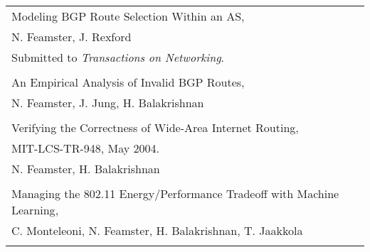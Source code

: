 \documentclass{article}
\begin{document}
\begin{flushleft}
\begin{tabular}{p{7 in}}
{\sc Modeling BGP Route Selection Within an AS}, \\
N. Feamster, J. Rexford \\
Submitted to {\em Transactions on Networking}. 
\\ \\ 

{\sc An Empirical Analysis of Invalid BGP Routes}, \\
N. Feamster, J. Jung, H. Balakrishnan \\ \\ 

{\sc Verifying the Correctness of Wide-Area Internet Routing}, \\
MIT-LCS-TR-948, May 2004. \\
N. Feamster, H. Balakrishnan \\ \\ 

{\sc Managing the 802.11 Energy/Performance Tradeoff with Machine Learning}, \\
C. Monteleoni, N. Feamster, H. Balakrishnan, T. Jaakkola \\ \\ 

\end{tabular}






\end{flushleft}
\end{document}

